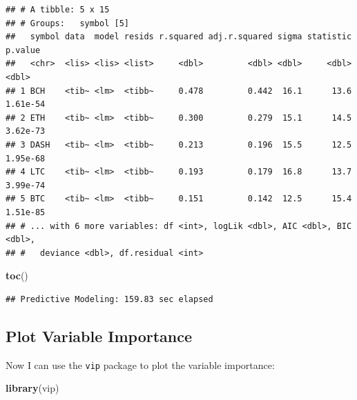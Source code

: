 \documentclass[
]{book}
\newenvironment{Shaded}{\begin{snugshade}}{\end{snugshade}}
\newcommand{\ControlFlowTok}[1]{\textcolor[rgb]{0.13,0.29,0.53}{\textbf{#1}}}
\newcommand{\DecValTok}[1]{\textcolor[rgb]{0.00,0.00,0.81}{#1}}
\newcommand{\KeywordTok}[1]{\textcolor[rgb]{0.13,0.29,0.53}{\textbf{#1}}}
\newcommand{\NormalTok}[1]{#1}
\newcommand{\OperatorTok}[1]{\textcolor[rgb]{0.81,0.36,0.00}{\textbf{#1}}}
\newcommand{\StringTok}[1]{\textcolor[rgb]{0.31,0.60,0.02}{#1}}
\begin{document}
\begin{verbatim}
## # A tibble: 5 x 15
## # Groups:   symbol [5]
##   symbol data  model resids r.squared adj.r.squared sigma statistic  p.value
##   <chr>  <lis> <lis> <list>     <dbl>         <dbl> <dbl>     <dbl>    <dbl>
## 1 BCH    <tib~ <lm>  <tibb~     0.478         0.442  16.1      13.6 1.61e-54
## 2 ETH    <tib~ <lm>  <tibb~     0.300         0.279  15.1      14.5 3.62e-73
## 3 DASH   <tib~ <lm>  <tibb~     0.213         0.196  15.5      12.5 1.95e-68
## 4 LTC    <tib~ <lm>  <tibb~     0.193         0.179  16.8      13.7 3.99e-74
## 5 BTC    <tib~ <lm>  <tibb~     0.151         0.142  12.5      15.4 1.51e-85
## # ... with 6 more variables: df <int>, logLik <dbl>, AIC <dbl>, BIC <dbl>,
## #   deviance <dbl>, df.residual <int>
\end{verbatim}

\begin{Shaded}
\begin{Highlighting}[]
\KeywordTok{toc}\NormalTok{()}
\end{Highlighting}
\end{Shaded}

\begin{verbatim}
## Predictive Modeling: 159.83 sec elapsed
\end{verbatim}

\hypertarget{plot-variable-importance}{%
\subsection{Plot Variable Importance}\label{plot-variable-importance}}

Now I can use the \texttt{vip} \citep{R-vip} package to plot the variable importance:

\begin{Shaded}
\begin{Highlighting}[]
\KeywordTok{library}\NormalTok{(vip)}
\end{Highlighting}
\end{Shaded}

\begin{Shaded}
\end{Shaded}
\end{document}
